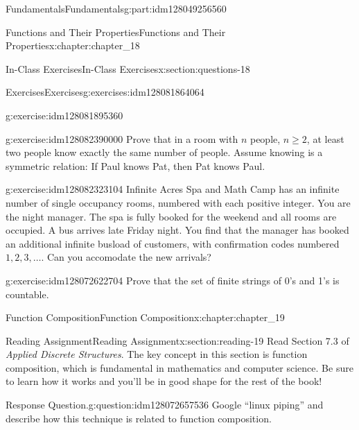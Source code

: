 \documentclass[oneside,10pt,]{book}
\numberwithin{equation}{section}
\begin{document}
\begin{partptx}{Fundamentals}{}{Fundamentals}{}{}{g:part:idm128049256560}
\begin{chapterptx}{Functions and Their Properties}{}{Functions and Their Properties}{}{}{x:chapter:chapter_18}
\begin{sectionptx}{In-Class Exercises}{}{In-Class Exercises}{}{}{x:section:questions-18}
\begin{exercises-subsection}{Exercises}{}{Exercises}{}{}{g:exercises:idm128081864064}
\begin{exercisegroup}
\begin{divisionexerciseeg}{1}{}{}{g:exercise:idm128081895360}
%
\end{divisionexerciseeg}%
\begin{divisionexerciseeg}{2}{}{}{g:exercise:idm128082390000}%
Prove that in a room with \(n\) people, \(n \geq 2\), at least two people know exactly the same number of people. Assume knowing is a symmetric relation: If Paul knows Pat, then Pat knows Paul.%
\end{divisionexerciseeg}%
\begin{divisionexerciseeg}{3}{}{}{g:exercise:idm128082323104}%
Infinite Acres Spa and Math Camp has an infinite number of single occupancy rooms, numbered with each positive integer.  You are the night manager.  The spa is fully booked for the weekend and all rooms are occupied. A bus arrives late Friday night.  You find that the manager has booked an additional infinite busload of customers, with confirmation codes numbered \(1, 2, 3, \dots\).   Can you accomodate the new arrivals?%
\end{divisionexerciseeg}%
\begin{divisionexerciseeg}{4}{}{}{g:exercise:idm128072622704}%
Prove that the set of finite strings of 0's and 1's is countable.%
\end{divisionexerciseeg}%
\end{exercisegroup}
\par\medskip\noindent
\end{exercises-subsection}
\end{sectionptx}
\end{chapterptx}
%
\typeout{************************************************}
\typeout{************************************************}
%
\begin{chapterptx}{Function Composition}{}{Function Composition}{}{}{x:chapter:chapter_19}
%
%
%
\typeout{************************************************}
\typeout{************************************************}
%
\begin{sectionptx}{Reading Assignment}{}{Reading Assignment}{}{}{x:section:reading-19}
Read Section 7.3 of \emph{Applied Discrete Structures}.  The key concept in this section is function composition, which is fundamental in mathematics and computer science. Be sure to learn how it works and you'll be in good shape for the rest of the book!%
\begin{question}{Response Question.}{g:question:idm128072657536}%
Google ``linux piping'' and describe how this technique is related to function composition.%

\end{question}
\end{sectionptx}
\end{chapterptx}
\end{partptx}
\end{document}
